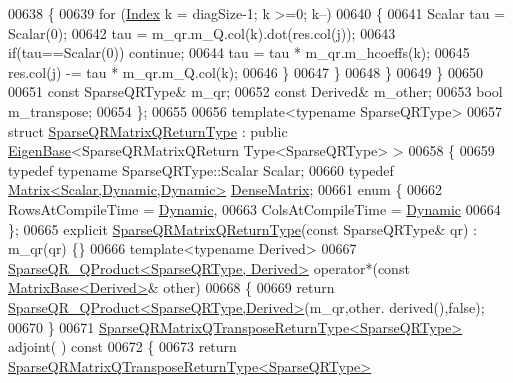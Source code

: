 \begin{DoxyCode}
00638       \{
00639         \textcolor{keywordflow}{for} (\hyperlink{namespace_eigen_a62e77e0933482dafde8fe197d9a2cfde}{Index} k = diagSize-1; k >=0; k--)
00640         \{
00641           Scalar tau = Scalar(0);
00642           tau = m\_qr.m\_Q.col(k).dot(res.col(j));
00643           \textcolor{keywordflow}{if}(tau==Scalar(0)) \textcolor{keywordflow}{continue};
00644           tau = tau * m\_qr.m\_hcoeffs(k);
00645           res.col(j) -= tau * m\_qr.m\_Q.col(k);
00646         \}
00647       \}
00648     \}
00649   \}
00650   
00651   \textcolor{keyword}{const} SparseQRType& m\_qr;
00652   \textcolor{keyword}{const} Derived& m\_other;
00653   \textcolor{keywordtype}{bool} m\_transpose;
00654 \};
00655 
00656 \textcolor{keyword}{template}<\textcolor{keyword}{typename} SparseQRType>
00657 \textcolor{keyword}{struct }\hyperlink{struct_eigen_1_1_sparse_q_r_matrix_q_return_type}{SparseQRMatrixQReturnType} : \textcolor{keyword}{public} \hyperlink{group___core___module_struct_eigen_1_1_eigen_base}{EigenBase}<SparseQRMatrixQReturn
      Type<SparseQRType> >
00658 \{  
00659   \textcolor{keyword}{typedef} \textcolor{keyword}{typename} SparseQRType::Scalar Scalar;
00660   \textcolor{keyword}{typedef} \hyperlink{group___core___module}{Matrix<Scalar,Dynamic,Dynamic>} 
      \hyperlink{group___core___module}{DenseMatrix};
00661   \textcolor{keyword}{enum} \{
00662     RowsAtCompileTime = \hyperlink{namespace_eigen_ad81fa7195215a0ce30017dfac309f0b2}{Dynamic},
00663     ColsAtCompileTime = \hyperlink{namespace_eigen_ad81fa7195215a0ce30017dfac309f0b2}{Dynamic}
00664   \};
00665   \textcolor{keyword}{explicit} \hyperlink{struct_eigen_1_1_sparse_q_r_matrix_q_return_type}{SparseQRMatrixQReturnType}(\textcolor{keyword}{const} SparseQRType& qr) : m\_qr(qr) \{\}
00666   \textcolor{keyword}{template}<\textcolor{keyword}{typename} Derived>
00667   \hyperlink{struct_eigen_1_1_sparse_q_r___q_product}{SparseQR\_QProduct<SparseQRType, Derived>} operator*(\textcolor{keyword}{const} 
      \hyperlink{group___core___module_class_eigen_1_1_matrix_base}{MatrixBase<Derived>}& other)
00668   \{
00669     \textcolor{keywordflow}{return} \hyperlink{struct_eigen_1_1_sparse_q_r___q_product}{SparseQR\_QProduct<SparseQRType,Derived>}(m\_qr,other.
      derived(),\textcolor{keyword}{false});
00670   \}
00671   \hyperlink{struct_eigen_1_1_sparse_q_r_matrix_q_transpose_return_type}{SparseQRMatrixQTransposeReturnType<SparseQRType>} adjoint(
      )\textcolor{keyword}{ const}
00672 \textcolor{keyword}{  }\{
00673     \textcolor{keywordflow}{return} \hyperlink{struct_eigen_1_1_sparse_q_r_matrix_q_transpose_return_type}{SparseQRMatrixQTransposeReturnType<SparseQRType>}

\end{DoxyCode}
